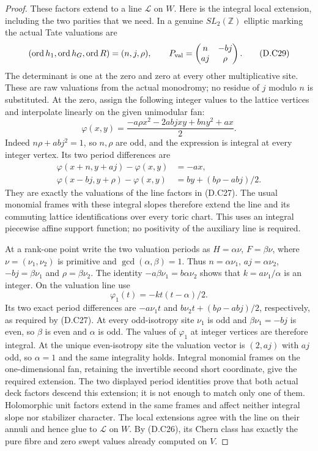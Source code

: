 \begin{proof}
These factors extend to a line $\mathcal L$ on $W$. Here is the
integral local extension, including the two parities that we need.
In a genuine $SL_2(\mathbb Z)$ elliptic marking the actual Tate
valuations are
\[
 (\operatorname{ord}h_1,\operatorname{ord}h_G,
       \operatorname{ord}R)=(n,j,\rho),\qquad
 P_{\rm val}=\begin{pmatrix}n&-bj\\aj&\rho\end{pmatrix}.
                                                               \tag{D.C29}
\]
The determinant is one at the zero and zero at every other
multiplicative site. These are raw valuations from the actual
monodromy; no residue of $j$ modulo $n$ is substituted.
At the zero, assign the following integer values to the lattice
vertices and interpolate linearly on the given unimodular fan:
\[
 \varphi(x,y)=
 \frac{-a\rho x^2-2abjxy+bn y^2+ax}{2}.                        \tag{D.C210}
\]
Indeed $n\rho+abj^2=1$, so $n,\rho$ are odd, and the expression is
integral at every integer vertex. Its two period differences are
\[
\begin{aligned}
 \varphi(x+n,y+aj)-\varphi(x,y)&=-ax,\\
 \varphi(x-bj,y+\rho)-\varphi(x,y)
          &=by+(b\rho-abj)/2.
\end{aligned}                                                   \tag{D.C211}
\]
They are exactly the valuations of the line factors in (D.C27).
The usual monomial frames with these integral slopes therefore extend
the line and its commuting lattice identifications over every toric
chart. This uses an integral piecewise affine support function; no
positivity of the auxiliary line is required.

At a rank-one point write the two valuation periods as
$H=\alpha\nu$, $F=\beta\nu$, where
$\nu=(\nu_1,\nu_2)$ is primitive and
$\gcd(\alpha,\beta)=1$. Thus
$n=\alpha\nu_1$, $aj=\alpha\nu_2$,
$-bj=\beta\nu_1$ and $\rho=\beta\nu_2$.
The identity $-a\beta\nu_1=b\alpha\nu_2$ shows that
$k=a\nu_1/\alpha$ is an integer. On the valuation line use
\[
             \varphi_1(t)=-k t(t-\alpha)/2.
\]
Its two exact period differences are
$-a\nu_1t$ and
$b\nu_2t+(b\rho-abj)/2$, respectively, as required by
(D.C27). At every odd-isotropy site $\nu_1$ is odd and
$\beta\nu_1=-bj$ is even, so $\beta$ is even and $\alpha$
is odd. The values of $\varphi_1$ at integer vertices are therefore
integral. At the unique even-isotropy site the valuation vector is
$(2,aj)$ with $aj$ odd, so $\alpha=1$ and the same integrality
holds. Integral monomial frames on the one-dimensional fan, retaining
the invertible second short coordinate, give the required extension.
The two displayed period identities prove that both actual deck
factors descend this extension; it is not enough to match only one
of them.
Holomorphic unit factors extend in the same frames and affect neither
integral slope nor stabilizer character. The local extensions agree
with the line on their annuli and hence glue to $\mathcal L$ on $W$.
By (D.C26), its Chern class has exactly the pure fibre and zero swept
values already computed on $V$.


\end{proof}
